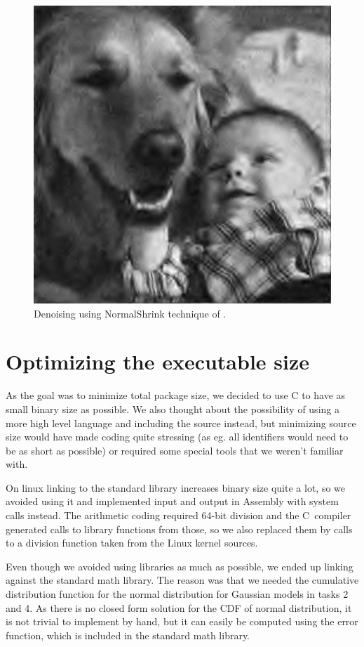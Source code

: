 \documentclass{article}
\begin{document}
\begin{figure}
    \centering
    \includegraphics[scale=0.4]{kd_normalshrink}
    \caption{Denoising using NormalShrink technique of \cite{ksc02}.}\label{fig:normalsht}
\end{figure}

\section{Optimizing the executable size}

As the goal was to minimize total package size, we decided to use C to have as small binary size as possible.
We also thought about the possibility of using a more high level language and including the source instead, but minimizing source size would have made coding quite stressing (as eg. all identifiers would need to be as short as possible) or required some special tools that we weren't familiar with.

On linux linking to the standard library increases binary size quite a lot,
so we avoided using it and implemented input and output in Assembly with system calls instead.
The arithmetic coding required 64-bit division and the C~compiler generated calls to library functions from those, so we also replaced them by calls to a division function taken from the Linux kernel sources.

Even though we avoided using libraries as much as possible, we ended up linking against the standard math library.
The reason was that we needed the cumulative distribution function for the normal distribution for Gaussian models in tasks 2 and 4.
As there is no closed form solution for the CDF of normal distribution, it is not trivial to implement by hand, but it can easily be computed using the error function, which is included in the standard math library.





\end{document}
